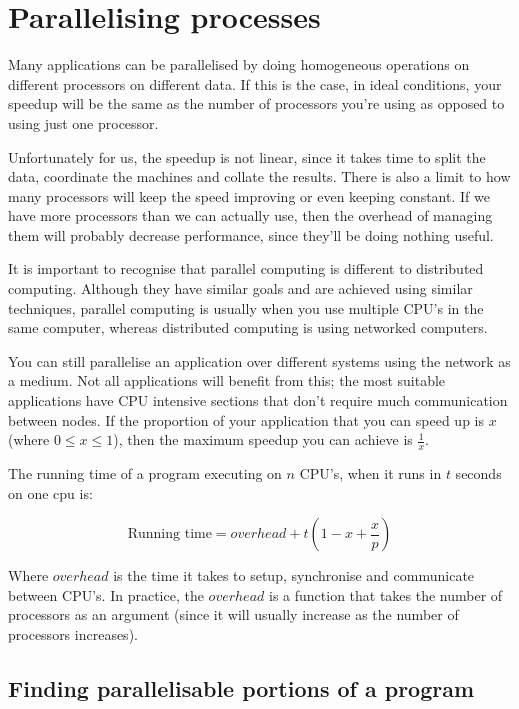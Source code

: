 \section{Parallelising processes}

Many applications can be parallelised by doing homogeneous operations on different
processors on different data. If this is the case, in ideal conditions, your
speedup will be the same as the number of processors you're using as opposed to
using just one processor.

Unfortunately for us, the speedup is not linear, since it takes time to split
the data, coordinate the machines and collate the results. There is also a limit
to how many processors will keep the speed improving or even keeping constant.
If we have more processors than we can actually use, then the overhead of
managing them will probably decrease performance, since they'll be doing nothing
useful.

It is important to recognise that parallel computing is different to distributed
computing. Although they have similar goals and are achieved using similar
techniques, parallel computing is usually when you use multiple CPU's in the
same computer, whereas distributed computing is using networked computers.

You can still parallelise an application over different systems using the
network as a medium. Not all applications will benefit from this; the most
suitable applications have CPU intensive sections that don't require much
communication between nodes. If the proportion of your application that you can
speed up is $x$ (where $0 \leq x \leq 1$), then the maximum speedup you can
achieve is $\frac{1}{x}$.

The running time of a program executing on $n$ CPU's, when it runs in $t$
seconds on one cpu is:

\[
  \text{Running time} = overhead + t\left(1 - x + \frac{x}{p}\right)
\]

Where $overhead$ is the time it takes to setup, synchronise and communicate
between CPU's. In practice, the $overhead$ is a function that takes the number
of processors as an argument (since it will usually increase as the number of
processors increases).


\subsection{Finding parallelisable portions of a program}

